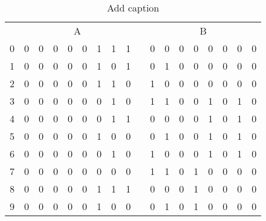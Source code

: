 \begin{table}[htbp]
	\centering
	\caption{Add caption}
	\begin{tabular}{|c|c|c|c|c|c|c|c|c|c|c|c|c|c|c|c|c|c|}
		\hline
		\rowcolor[rgb]{ .949,  .949,  .949} \multicolumn{18}{|c|}{REG} \bigstrut\\
		\hline
		\rowcolor[rgb]{ .949,  .949,  .949} \multicolumn{1}{|p{2.145em}|}{CLK} & \multicolumn{8}{c|}{A}                                        &       & \multicolumn{8}{c|}{B} \bigstrut\\
		\hline
		0     & 0     & 0     & 0     & 0     & 0     & 1     & 1     & 1     & \multirow{19}[38]{*}{} & 0     & 0     & 0     & 0     & 0     & 0     & 0     & 0 \bigstrut\\
		\cline{1-9}\cline{11-18}    1     & 0     & 0     & 0     & 0     & 0     & 1     & 0     & 1     &       & 0     & 1     & 0     & 0     & 0     & 0     & 0     & 0 \bigstrut\\
		\cline{1-9}\cline{11-18}    2     & 0     & 0     & 0     & 0     & 0     & 1     & 1     & 0     &       & 1     & 0     & 0     & 0     & 0     & 0     & 0     & 0 \bigstrut\\
		\cline{1-9}\cline{11-18}    3     & 0     & 0     & 0     & 0     & 0     & 0     & 1     & 0     &       & 1     & 1     & 0     & 0     & 1     & 0     & 1     & 0 \bigstrut\\
		\cline{1-9}\cline{11-18}    4     & 0     & 0     & 0     & 0     & 0     & 0     & 1     & 1     &       & 0     & 0     & 0     & 0     & 1     & 0     & 1     & 0 \bigstrut\\
		\cline{1-9}\cline{11-18}    5     & 0     & 0     & 0     & 0     & 0     & 1     & 0     & 0     &       & 0     & 1     & 0     & 0     & 1     & 0     & 1     & 0 \bigstrut\\
		\cline{1-9}\cline{11-18}    6     & 0     & 0     & 0     & 0     & 0     & 0     & 1     & 0     &       & 1     & 0     & 0     & 0     & 1     & 0     & 1     & 0 \bigstrut\\
		\cline{1-9}\cline{11-18}    7     & 0     & 0     & 0     & 0     & 0     & 0     & 0     & 0     &       & 1     & 1     & 0     & 1     & 0     & 0     & 0     & 0 \bigstrut\\
		\cline{1-9}\cline{11-18}    8     & 0     & 0     & 0     & 0     & 0     & 1     & 1     & 1     &       & 0     & 0     & 0     & 1     & 0     & 0     & 0     & 0 \bigstrut\\
		\cline{1-9}\cline{11-18}    9     & 0     & 0     & 0     & 0     & 0     & 1     & 0     & 0     &       & 0     & 1     & 0     & 1     & 0     & 0     & 0     & 0 \bigstrut\\

\end{tabular}
\end{table}
